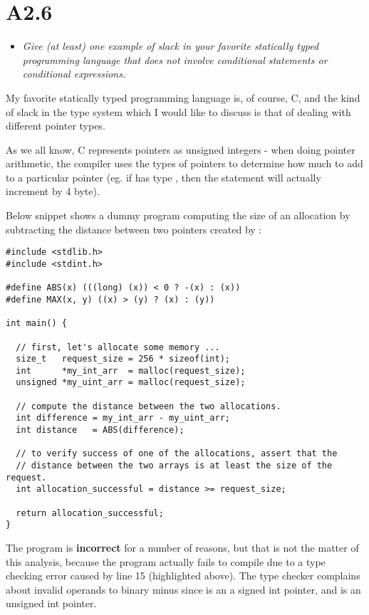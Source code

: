 \newpage
\section{A2.6}

\begin{itemize}
  \item \emph{Give (at least) one example of slack in your favorite statically
    typed programming language that \emph{does not} involve conditional
    statements or conditional expressions.}
\end{itemize}

My favorite statically typed programming language is, of course, C, and the kind
of slack in the type system which I would like to discuss is that of dealing
with different pointer types.

\smallskip

As we all know, C represents pointers as unsigned integers - when doing pointer
arithmetic, the compiler uses the types of pointers to determine how much to add
to a particular pointer (eg. if  has type , then the
statement  will actually increment  by 4 byte).

\medskip


Below snippet shows a dummy program computing the size of an allocation by
subtracting the distance between two pointers created by :


\begin{verbatim}
#include <stdlib.h>
#include <stdint.h>

#define ABS(x) (((long) (x)) < 0 ? -(x) : (x))
#define MAX(x, y) ((x) > (y) ? (x) : (y))

int main() {

  // first, let's allocate some memory ...
  size_t   request_size = 256 * sizeof(int);
  int      *my_int_arr  = malloc(request_size);
  unsigned *my_uint_arr = malloc(request_size);

  // compute the distance between the two allocations.
  int difference = my_int_arr - my_uint_arr;
  int distance   = ABS(difference);

  // to verify success of one of the allocations, assert that the
  // distance between the two arrays is at least the size of the request.
  int allocation_successful = distance >= request_size;

  return allocation_successful;
}
\end{verbatim}

The program is \textbf{incorrect} for a number of reasons, but that is not the
matter of this analysis, because the program actually fails to compile due to a
type checking error caused by line 15 (highlighted above). The type checker
complains about invalid operands to binary minus since  is an
a signed int pointer, and  is an unsigned int pointer.

